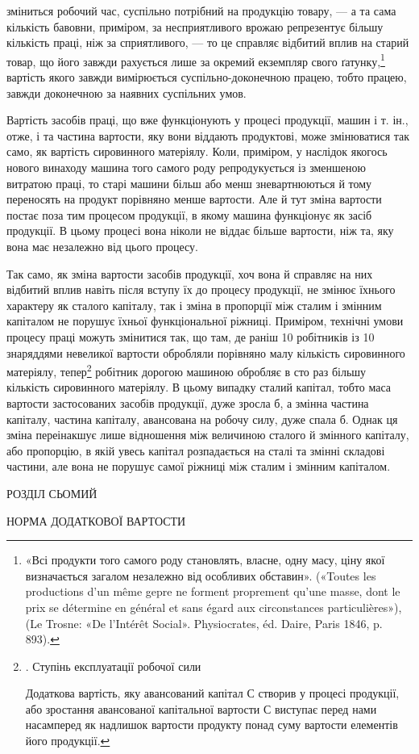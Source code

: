 зміниться робочий час, суспільно потрібний на продукцію товару, — а та сама кількість бавовни,
приміром, за несприятливого врожаю репрезентує більшу кількість праці, ніж за сприятливого,
— то це справляє відбитий вплив на старий товар, що його завжди рахується лише за окремий екземпляр
свого ґатунку,\footnote{
«Всі продукти того самого роду становлять, власне, одну масу, ціну якої визначається загалом
незалежно від особливих обставин». («Toutes les productions d’un même gepre ne forment proprement
qu’une masse, dont le prix se détermine en général et sans égard aux circonstances particulières»),
(Le Trosne: «De l’Intérêt Social». Physiocrates, éd. Daire,
Paris 1846, p. 893).
}
вартість якого завжди вимірюється суспільно-доконечною працею, тобто працею, завжди доконечною за
наявних суспільних умов.

Вартість засобів праці, що вже функціонують у процесі продукції,
машин і т. ін., отже, і та частина вартости, яку вони віддають продуктові, може змінюватися так
само, як вартість сировинного матеріялу. Коли, приміром, у наслідок якогось нового винаходу машина
того самого роду репродукується із зменшеною витратою праці, то старі машини більш або менш
зневартнюються
й тому переносять на продукт порівняно менше вартости. Але й тут зміна вартости постає поза тим
процесом продукції,
в якому машина функціонує як засіб продукції. В цьому процесі вона ніколи не віддає більше вартости,
ніж та, яку вона має
незалежно від цього процесу.

Так само, як зміна вартости засобів продукції, хоч вона й справляє на них відбитий вплив навіть
після вступу їх до процесу продукції, не змінює їхнього характеру як сталого капіталу, так і зміна в
пропорції між сталим і змінним капіталом не порушує їхньої функціональної ріжниці. Приміром,
технічні умови процесу праці можуть змінитися так, що там, де раніш 10 робітників із 10 знаряддями
невеликої вартости обробляли порівняно малу кількість сировинного матеріялу, тепер\footnote{
. Ступінь експлуатації робочої сили

Додаткова вартість, яку авансований капітал С створив у процесі продукції, або зростання авансованої
капітальної вартости С виступає перед нами насамперед як надлишок вартости
продукту понад суму вартости елементів його продукції.
} робітник
дорогою машиною обробляє в сто раз більшу кількість сировинного матеріялу. В цьому випадку сталий
капітал, тобто маса вартости застосованих
засобів продукції, дуже зросла б, а змінна частина капіталу, частина капіталу, авансована на робочу
силу, дуже спала б.
Однак ця зміна переінакшує лише відношення між величиною сталого й змінного капіталу, або пропорцію,
в якій увесь капітал розпадається на сталі та змінні складові частини, але вона не
порушує самої ріжниці між сталим і змінним капіталом.

РОЗДІЛ СЬОМИЙ

НОРМА ДОДАТКОВОЇ ВАРТОСТИ